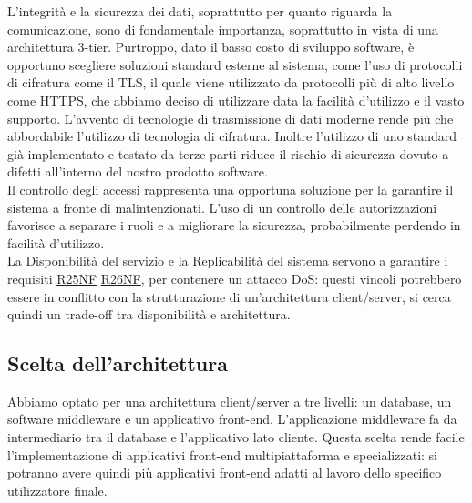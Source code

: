 \documentclass[a4paper]{article}
\begin{document}
L'integrità e la sicurezza dei dati, soprattutto per quanto riguarda la comunicazione, sono di fondamentale importanza, soprattutto in vista di una architettura 3-tier. Purtroppo, dato il basso costo di sviluppo software, è opportuno scegliere soluzioni standard esterne al sistema, come l'uso di protocolli di cifratura come il TLS, il quale viene utilizzato da protocolli più di alto livello come HTTPS, che abbiamo deciso di utilizzare data la facilità d'utilizzo e il vasto supporto. L'avvento di tecnologie di trasmissione di dati moderne rende più che abbordabile l'utilizzo di tecnologia di cifratura. Inoltre l'utilizzo di uno standard già implementato e testato da terze parti riduce il rischio di sicurezza dovuto a difetti all'interno del nostro prodotto software.\\Il controllo degli accessi rappresenta una opportuna soluzione per la garantire il sistema a fronte di malintenzionati. L'uso di un controllo delle autorizzazioni favorisce a separare i ruoli e a migliorare la sicurezza, probabilmente perdendo in facilità d'utilizzo.\\La Disponibilità del servizio e la Replicabilità del sistema servono a garantire i requisiti \hyperlink{R25NF}{R25NF} \hyperlink{R26NF}{R26NF}, per contenere un attacco DoS: questi vincoli potrebbero essere in conflitto con la strutturazione di un'architettura client/server, si cerca quindi un trade-off tra disponibilità e architettura.


\subsection{Scelta dell'architettura}
Abbiamo optato per una architettura client/server a tre livelli: un database, un software middleware e un applicativo front-end. L'applicazione middleware fa da intermediario tra il database e l'applicativo lato cliente. Questa scelta rende facile l'implementazione di applicativi front-end multipiattaforma e specializzati: si potranno avere quindi più applicativi front-end adatti al lavoro dello specifico utilizzatore finale.
\end{document}
